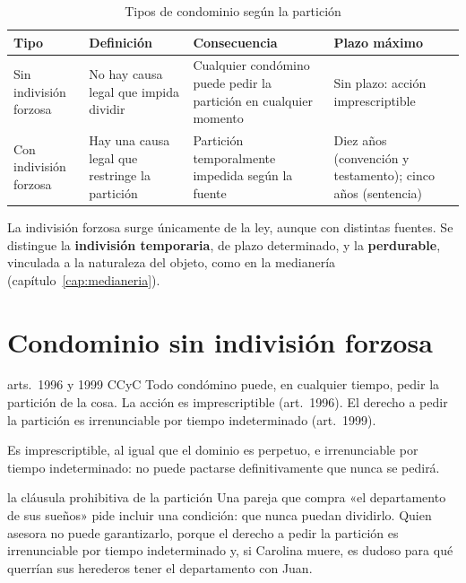 \documentclass[12pt,oneside]{book}
\begin{document}
\begin{table}[H]
\centering
\small
\begin{tabularx}{\textwidth}{>{\raggedright\arraybackslash}p{}>{\raggedright\arraybackslash}X>{\raggedright\arraybackslash}X>{\raggedright\arraybackslash}X}
\toprule
\textbf{Tipo} & \textbf{Definición} & \textbf{Consecuencia} & \textbf{Plazo máximo} \\
\midrule
Sin indivisión forzosa & No hay causa legal que impida dividir & Cualquier condómino puede pedir la partición en cualquier momento & Sin plazo: acción imprescriptible \\
Con indivisión forzosa & Hay una causa legal que restringe la partición & Partición temporalmente impedida según la fuente & Diez años (convención y testamento); cinco años (sentencia) \\
\bottomrule
\end{tabularx}
\caption{Tipos de condominio según la partición}
\end{table}

La indivisión forzosa surge únicamente de la ley, aunque con distintas fuentes. Se distingue la \textbf{indivisión temporaria}, de plazo determinado, y la \textbf{perdurable}, vinculada a la naturaleza del objeto, como en la medianería (capítulo~\ref{cap:medianeria}).

\section{Condominio sin indivisión forzosa}

\begin{regla}{arts.~1996 y 1999 CCyC}
Todo condómino puede, en cualquier tiempo, pedir la partición de la cosa. La acción es imprescriptible (art.~1996). El derecho a pedir la partición es irrenunciable por tiempo indeterminado (art.~1999).
\end{regla}

Es imprescriptible, al igual que el dominio es perpetuo, e irrenunciable por tiempo indeterminado: no puede pactarse definitivamente que nunca se pedirá.

\begin{ejemplo}{la cláusula prohibitiva de la partición}
Una pareja que compra «el departamento de sus sueños» pide incluir una condición: que nunca puedan dividirlo. Quien asesora no puede garantizarlo, porque el derecho a pedir la partición es irrenunciable por tiempo indeterminado y, si Carolina muere, es dudoso para qué querrían sus herederos tener el departamento con Juan.
\end{ejemplo}
\end{document}
